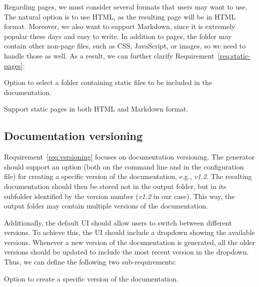 Regarding pages, we must consider several formats that users may want to use.
The natural option is to use HTML, as the resulting page will be in HTML format.
Moreover, we also want to support Markdown, since it is extremely popular these days and easy to write.
In addition to pages, the folder may contain other non-page files, such as CSS, JavaScript, or images, so we need to handle those as well.
As a result, we can further clarify Requirement~\ref{req:static-pages}:

\setcounter{subrequirementcounter}{3}
\setcounter{subrequirement}{0}

\begin{subrequirement}
    Option to select a folder containing static files to be included in the documentation. 
    \label{subreq:static-pages-folder}
\end{subrequirement}

\begin{subrequirement}
    Support static pages in both HTML and Markdown format.
    \label{subreq:static-pages-format}
\end{subrequirement}

\subsection*{Documentation versioning}
\label{sec:doc-versions}

Requirement~\ref{req:versioning} focuses on documentation versioning.
The generator should support an option (both on the command line and in the configuration file) for creating a specific version of the documentation, e.g., \textit{v1.2}. 
The resulting documentation should then be stored not in the output folder, but in its subfolder identified by the version number (\textit{v1.2} in our case).
This way, the output folder may contain multiple versions of the documentation.

Additionally, the default UI should allow users to switch between different versions.
To achieve this, the UI should include a dropdown showing the available versions.
Whenever a new version of the documentation is generated, all the older versions should be updated to include the most recent version in the dropdown.
Thus, we can define the following two sub-requirements:

\setcounter{subrequirementcounter}{4}
\setcounter{subrequirement}{0}

\begin{subrequirement}
    Option to create a specific version of the documentation.
    \label{subreq:doc-version-option}
\end{subrequirement}

